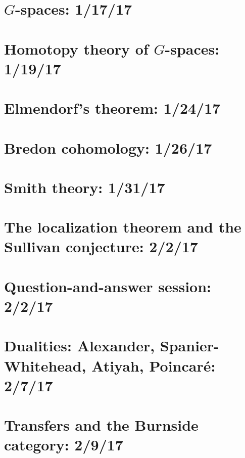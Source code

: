 \documentclass{style_EHT}
\begin{document}
\frontstuff

\section{$G$-spaces: 1/17/17}
	
\section{Homotopy theory of $G$-spaces: 1/19/17}
	
\section{Elmendorf's theorem: 1/24/17}
	
\section{Bredon cohomology: 1/26/17}
	
\section{Smith theory: 1/31/17}
	
\section{The localization theorem and the Sullivan conjecture: 2/2/17}
	
\section{Question-and-answer session: 2/2/17}
	
\section{Dualities: Alexander, Spanier-Whitehead, Atiyah, Poincaré: 2/7/17}
	
\section{Transfers and the Burnside category: 2/9/17}
	

{}

\end{document}
